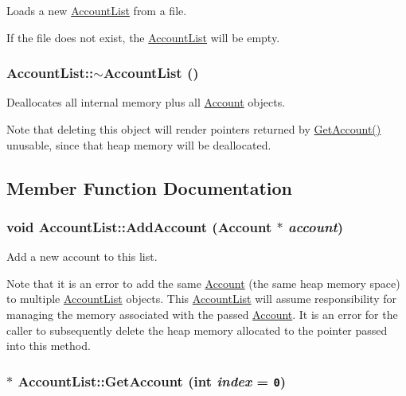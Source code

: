 Loads a new \hyperlink{classAccountList}{AccountList} from a file. 

If the file does not exist, the \hyperlink{classAccountList}{AccountList} will be empty. \hypertarget{classAccountList_77acd32be8700d21271e8802d87e2b15}{
\subsubsection[{$\sim$AccountList}]{\setlength{\rightskip}{0pt plus 5cm}AccountList::$\sim$AccountList ()}}
\label{classAccountList_77acd32be8700d21271e8802d87e2b15}


Deallocates all internal memory plus all \hyperlink{classAccount}{Account} objects. 

Note that deleting this object will render pointers returned by \hyperlink{classAccountList_c3d69942a3a661112f5a141bbbb80909}{GetAccount()} unusable, since that heap memory will be deallocated. 

\subsection{Member Function Documentation}
\hypertarget{classAccountList_58880040232e0a6ba7e77096e26b6347}{
\subsubsection[{AddAccount}]{\setlength{\rightskip}{0pt plus 5cm}void AccountList::AddAccount ({\bf Account} $\ast$ {\em account})}}
\label{classAccountList_58880040232e0a6ba7e77096e26b6347}


Add a new account to this list. 

Note that it is an error to add the same \hyperlink{classAccount}{Account} (the same heap memory space) to multiple \hyperlink{classAccountList}{AccountList} objects. This \hyperlink{classAccountList}{AccountList} will assume responsibility for managing the memory associated with the passed \hyperlink{classAccount}{Account}. It is an error for the caller to subsequently delete the heap memory allocated to the pointer passed into this method. \hypertarget{classAccountList_c3d69942a3a661112f5a141bbbb80909}{
\subsubsection[{GetAccount}]{ $\ast$ AccountList::GetAccount (int {\em index} = {\tt 0})}}
\label{classAccountList_c3d69942a3a661112f5a141bbbb80909}


